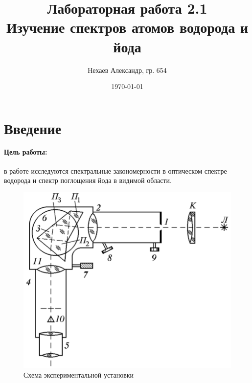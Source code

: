 \documentclass[a4paper, 12pt]{article}
\title{Лабораторная работа 2.1\\Изучение спектров атомов водорода и йода}
\author{Нехаев Александр, гр. 654}
\date{\today}
\begin{document}
\maketitle
\tableofcontents
\section{Введение}
\paragraph{Цель работы:} в работе исследуются спектральные закономерности в оптическом спектре водорода и спектр поглощения йода в видимой области.
\begin{figure}
	\includegraphics[scale=0.2]{scheme.png}
	\caption{Схема экспериментальной установки}
	\label{fig:scheme}
\end{figure}
\end{document}
